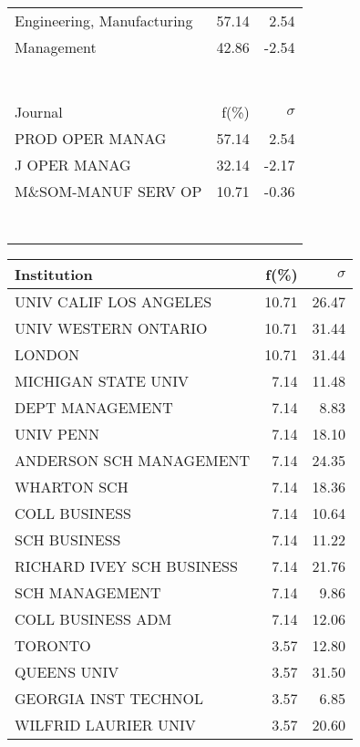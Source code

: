 \documentclass[a4paper,11pt]{report}
\begin{document}
\begin{landscape}
\begin{table}[!ht]
{\begin{tabular}{|l r  r|}
Engineering, Manufacturing & 57.14 & 2.54\\
Management & 42.86 & -2.54\\
 &  & \\
 &  & \\
 &  & \\
 &  & \\
 &  & \\
 &  & \\
 &  & \\
\hline
\hline
Journal & f(\%) & $\sigma$\\
\hline
PROD OPER MANAG & 57.14 & 2.54\\
J OPER MANAG & 32.14 & -2.17\\
M\&SOM-MANUF SERV OP & 10.71 & -0.36\\
 &  & \\
 &  & \\
 &  & \\
 &  & \\
 &  & \\
 &  & \\
 &  & \\
\hline
\end{tabular}
}
{\scriptsize\begin{tabular}{|l r r|}
\hline
Institution & f(\%) & $\sigma$\\
\hline
UNIV CALIF LOS ANGELES & 10.71 & 26.47\\
UNIV WESTERN ONTARIO & 10.71 & 31.44\\
LONDON & 10.71 & 31.44\\
MICHIGAN STATE UNIV & 7.14 & 11.48\\
DEPT MANAGEMENT & 7.14 & 8.83\\
UNIV PENN & 7.14 & 18.10\\
ANDERSON SCH MANAGEMENT & 7.14 & 24.35\\
WHARTON SCH & 7.14 & 18.36\\
COLL BUSINESS & 7.14 & 10.64\\
SCH BUSINESS & 7.14 & 11.22\\
RICHARD IVEY SCH BUSINESS & 7.14 & 21.76\\
SCH MANAGEMENT & 7.14 & 9.86\\
COLL BUSINESS ADM & 7.14 & 12.06\\
TORONTO & 3.57 & 12.80\\
QUEENS UNIV & 3.57 & 31.50\\
GEORGIA INST TECHNOL & 3.57 & 6.85\\
WILFRID LAURIER UNIV & 3.57 & 20.60\\

\end{tabular}}
\end{table}
\end{landscape}
\end{document}
